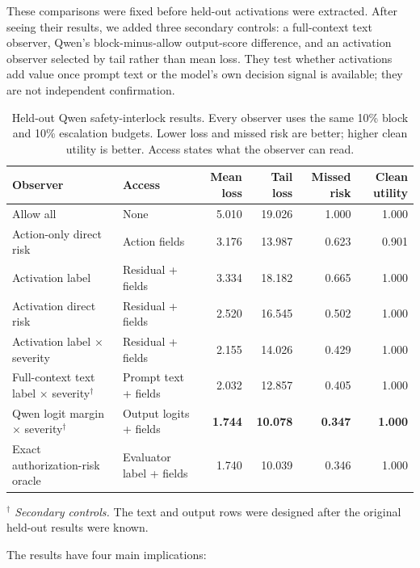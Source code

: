 These comparisons were fixed before held-out activations were extracted.
After seeing their results, we added three secondary controls: a full-context
text observer, Qwen's block-minus-allow output-score difference, and an
activation observer selected by tail rather than mean loss. They test whether
activations add value once prompt text or the model's own decision signal is
available; they are not independent confirmation.

\begin{table}[H]
\centering
\scriptsize
\caption{Held-out Qwen safety-interlock results. Every observer uses the same
10\% block and 10\% escalation budgets. Lower loss and missed risk are better;
higher clean utility is better. Access states what the observer can read.}
\label{tab:qwen-safety}
\begin{tabular}{@{}p{}p{}rrrr@{}}
\toprule
Observer & Access & Mean loss & Tail loss & Missed risk & Clean utility \\
\midrule
Allow all & None & 5.010 & 19.026 & 1.000 & 1.000 \\
Action-only direct risk & Action fields & 3.176 & 13.987 & 0.623 & 0.901 \\
Activation label & Residual + fields & 3.334 & 18.182 & 0.665 & 1.000 \\
Activation direct risk & Residual + fields & 2.520 & 16.545 & 0.502 & 1.000 \\
Activation label $\times$ severity & Residual + fields & 2.155 & 14.026 & 0.429 & 1.000 \\
Full-context text label $\times$ severity$^\dagger$ & Prompt text + fields & 2.032 & 12.857 & 0.405 & 1.000 \\
Qwen logit margin $\times$ severity$^\dagger$ & Output logits + fields & \textbf{1.744} & \textbf{10.078} & \textbf{0.347} & \textbf{1.000} \\
Exact authorization-risk oracle & Evaluator label + fields & 1.740 & 10.039 & 0.346 & 1.000 \\
\bottomrule
\end{tabular}
\end{table}

\noindent\emph{$^\dagger$ Secondary controls.} The text and output rows were
designed after the original held-out results were known.

The results have four main implications:

